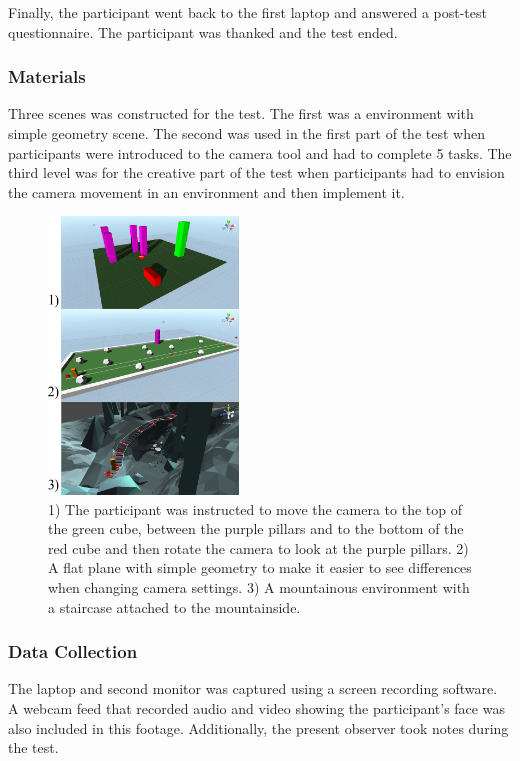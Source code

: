 Finally, the participant went back to the first laptop and answered a post-test questionnaire. The participant was thanked and the test ended.

\subsubsection{Materials}
Three scenes was constructed for the test. The first was a environment with simple geometry scene. The second was used in the first part of the test when participants were introduced to the camera tool and had to complete 5 tasks. The third level was for the creative part of the test when participants had to envision the camera movement in an environment and then implement it. 

\begin{figure}[htbp]
\centering
\includegraphics[width=0.45\textwidth]{Pics/sceneAll}
\caption{1) The participant was instructed to move the camera to the top of the green cube, between the purple pillars and to the bottom of the red cube and then rotate the camera to look at the purple pillars. 2) A flat plane with simple geometry to make it easier to see differences when changing camera settings. 3) A mountainous environment with a staircase attached to the mountainside.}
\label{fig:sceneAll}
\end{figure}

\subsubsection{Data Collection}
The laptop and second monitor was captured using a screen recording software. A webcam feed  that recorded audio and video showing the participant's face was also included in this footage. Additionally, the present observer took notes during the test.


